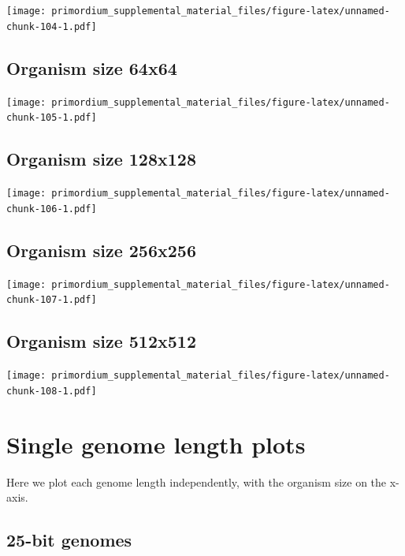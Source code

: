 \documentclass[]{book}
\begin{document}
\texttt{[image: primordium\_supplemental\_material\_files/figure-latex/unnamed-chunk-104-1.pdf]}

\hypertarget{organism-size-64x64-3}{%
\subsection{Organism size 64x64}\label{organism-size-64x64-3}}

\texttt{[image: primordium\_supplemental\_material\_files/figure-latex/unnamed-chunk-105-1.pdf]}

\hypertarget{organism-size-128x128-3}{%
\subsection{Organism size 128x128}\label{organism-size-128x128-3}}

\texttt{[image: primordium\_supplemental\_material\_files/figure-latex/unnamed-chunk-106-1.pdf]}

\hypertarget{organism-size-256x256-3}{%
\subsection{Organism size 256x256}\label{organism-size-256x256-3}}

\texttt{[image: primordium\_supplemental\_material\_files/figure-latex/unnamed-chunk-107-1.pdf]}

\hypertarget{organism-size-512x512-3}{%
\subsection{Organism size 512x512}\label{organism-size-512x512-3}}

\texttt{[image: primordium\_supplemental\_material\_files/figure-latex/unnamed-chunk-108-1.pdf]}

\hypertarget{single-genome-length-plots-1}{%
\section{Single genome length plots}\label{single-genome-length-plots-1}}

Here we plot each genome length independently, with the organism size on the x-axis.

\hypertarget{bit-genomes-5}{%
\subsection{25-bit genomes}\label{bit-genomes-5}}
\end{document}
